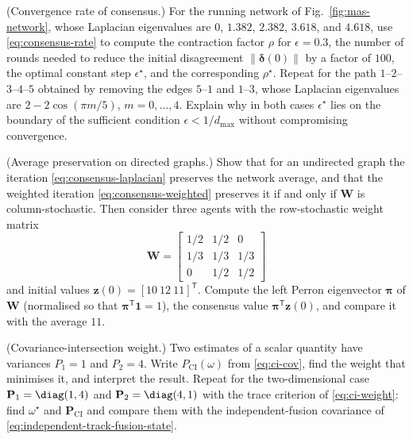 \begin{prob}\label{prob:ch06:1}
(Convergence rate of consensus.) For the running network of Fig.~\ref{fig:mas-network}, whose Laplacian eigenvalues are $0$, $1.382$, $2.382$, $3.618$, and $4.618$, use \eqref{eq:consensus-rate} to compute the contraction factor $\rho$ for $\epsilon=0.3$, the number of rounds needed to reduce the initial disagreement $\|\boldsymbol{\delta}(0)\|$ by a factor of $100$, the optimal constant step $\epsilon^{\star}$, and the corresponding $\rho^{\star}$. Repeat for the path $1$--$2$--$3$--$4$--$5$ obtained by removing the edges $5$--$1$ and $1$--$3$, whose Laplacian eigenvalues are $2-2\cos(\pi m/5)$, $m=0,\dots,4$. Explain why in both cases $\epsilon^{\star}$ lies on the boundary of the sufficient condition $\epsilon<1/d_{\max}$ without compromising convergence.
\end{prob}

\begin{prob}\label{prob:ch06:2}
(Average preservation on directed graphs.) Show that for an undirected graph the iteration \eqref{eq:consensus-laplacian} preserves the network average, and that the weighted iteration \eqref{eq:consensus-weighted} preserves it if and only if $\mathbf{W}$ is column-stochastic. Then consider three agents with the row-stochastic weight matrix
\begin{equation*}
\mathbf{W}=\begin{bmatrix}1/2&1/2&0\\ 1/3&1/3&1/3\\ 0&1/2&1/2\end{bmatrix}
\end{equation*}
and initial values $\mathbf{z}(0)=[10\ 12\ 11]^{\mathsf T}$. Compute the left Perron eigenvector $\boldsymbol{\pi}$ of $\mathbf{W}$ (normalised so that $\boldsymbol{\pi}^{\mathsf T}\mathbf{1}=1$), the consensus value $\boldsymbol{\pi}^{\mathsf T}\mathbf{z}(0)$, and compare it with the average $11$.
\end{prob}

\begin{prob}\label{prob:ch06:3}
(Covariance-intersection weight.) Two estimates of a scalar quantity have variances $P_1=1$ and $P_2=4$. Write $P_{\mathrm{CI}}(\omega)$ from \eqref{eq:ci-cov}, find the weight that minimises it, and interpret the result. Repeat for the two-dimensional case $\mathbf{P}_1=\diag(1,4)$ and $\mathbf{P}_2=\diag(4,1)$ with the trace criterion of \eqref{eq:ci-weight}: find $\omega^{\star}$ and $\mathbf{P}_{\mathrm{CI}}$ and compare them with the independent-fusion covariance of \eqref{eq:independent-track-fusion-state}.
\end{prob}

